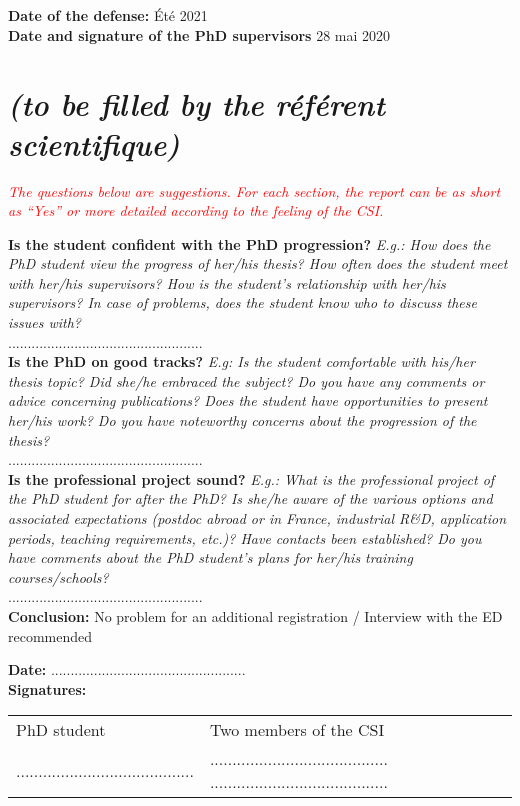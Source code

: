 \documentclass[12pt]{article}
\newcommand{\commentaire}[1]{\small\textit{#1}}
\begin{document}
\noindent\textbf{Date of the defense:}
Été 2021
\\


\noindent\textbf{Date and signature of the PhD supervisors}
28 mai 2020

\newpage
\section*{ \textit{\small (to be filled by the ré\-fé\-rent scientifique)}}

\commentaire{%
  \textcolor{red}{The questions below are suggestions. For each
    section, the report can be as short as “Yes” or more detailed
    according to the feeling of the CSI.\\}}

\noindent\textbf{Is the student confident with the PhD progression?}
\commentaire{%
  E.g.: How does the PhD student view the progress of
  her/his thesis? How often does the student meet with her/his
  supervisors? How is the student’s relationship with her/his
  supervisors? In case of problems, does the student know who to
  discuss these issues with?\\}
..................................................
\\

\noindent\textbf{Is the PhD on good tracks?}
\commentaire{%
  E.g: Is the student comfortable with his/her thesis topic? Did
  she/he embraced the subject? Do you have any comments or advice
  concerning publications? Does the student have opportunities to
  present her/his work? Do you have noteworthy concerns about the
  progression of the thesis?\\}
..................................................
\\

\noindent\textbf{Is the professional project sound?}
\commentaire{%
  E.g.: What is the professional project of the PhD student for after
  the PhD? Is she/he aware of the various options and associated
  expectations (postdoc abroad or in France, industrial R\&D,
  application periods, teaching requirements, etc.)? Have contacts
  been established? Do you have comments about the PhD student’s
  plans for her/his training courses/schools?\\}
..................................................
\\

\noindent\textbf{Conclusion:}
No problem for an additional registration / Interview with the ED
recommended

\bigskip

\noindent\textbf{Date:}
..................................................
\\

\noindent\textbf{Signatures:}

\begin{tabular}{p{5cm}p{12cm}}
  PhD student & Two members of the CSI\\
  ........................................
  &
  ........................................
  ........................................
\end{tabular}
\end{document}
